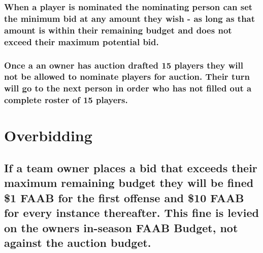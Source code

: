 \documentclass[]{book}
\begin{document}
\hypertarget{when-a-player-is-nominated-the-nominating-person-can-set-the-minimum-bid-at-any-amount-they-wish---as-long-as-that-amount-is-within-their-remaining-budget-and-does-not-exceed-their-maximum-potential-bid.}{%
\subsubsection{When a player is nominated the nominating person can set the minimum bid at any amount they wish - as long as that amount is within their remaining budget and does not exceed their maximum potential bid.}\label{when-a-player-is-nominated-the-nominating-person-can-set-the-minimum-bid-at-any-amount-they-wish---as-long-as-that-amount-is-within-their-remaining-budget-and-does-not-exceed-their-maximum-potential-bid.}}

\hypertarget{once-a-an-owner-has-auction-drafted-15-players-they-will-not-be-allowed-to-nominate-players-for-auction.-their-turn-will-go-to-the-next-person-in-order-who-has-not-filled-out-a-complete-roster-of-15-players.}{%
\subsubsection{Once a an owner has auction drafted 15 players they will not be allowed to nominate players for auction. Their turn will go to the next person in order who has not filled out a complete roster of 15 players.}\label{once-a-an-owner-has-auction-drafted-15-players-they-will-not-be-allowed-to-nominate-players-for-auction.-their-turn-will-go-to-the-next-person-in-order-who-has-not-filled-out-a-complete-roster-of-15-players.}}

\hypertarget{overbidding}{%
\section{Overbidding}\label{overbidding}}

\hypertarget{if-a-team-owner-places-a-bid-that-exceeds-their-maximum-remaining-budget-they-will-be-fined-1-faab-for-the-first-offense-and-10-faab-for-every-instance-thereafter.-this-fine-is-levied-on-the-owners-in-season-faab-budget-not-against-the-auction-budget.}{%
\subsection{If a team owner places a bid that exceeds their maximum remaining budget they will be fined \$1 FAAB for the first offense and \$10 FAAB for every instance thereafter. This fine is levied on the owners in-season FAAB Budget, not against the auction budget.}\label{if-a-team-owner-places-a-bid-that-exceeds-their-maximum-remaining-budget-they-will-be-fined-1-faab-for-the-first-offense-and-10-faab-for-every-instance-thereafter.-this-fine-is-levied-on-the-owners-in-season-faab-budget-not-against-the-auction-budget.}}
\end{document}
